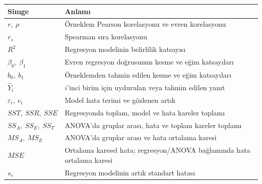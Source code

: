 \par\smallskip
\begin{center}
\begin{tabular}{@{}>{\RaggedRight\arraybackslash}p{}>{\RaggedRight\arraybackslash}p{}@{}}
\toprule
\textbf{Simge} & \textbf{Anlamı} \\
\midrule
$r,\ \rho$ & Örneklem Pearson korelasyonu ve evren korelasyonu \\
$r_s$ & Spearman sıra korelasyonu \\
$R^2$ & Regresyon modelinin belirlilik katsayısı \\
$\beta_0,\ \beta_1$ & Evren regresyon doğrusunun kesme ve eğim katsayıları \\
$b_0,\ b_1$ & Örneklemden tahmin edilen kesme ve eğim katsayıları \\
$\widehat Y_i$ & $i$'inci birim için uydurulan veya tahmin edilen yanıt \\
$\varepsilon_i,\ e_i$ & Model hata terimi ve gözlenen artık \\
$SST,\ SSR,\ SSE$ & Regresyonda toplam, model ve hata kareler toplamı \\
$SS_A,\ SS_E,\ SS_T$ & ANOVA'da gruplar arası, hata ve toplam kareler toplamı \\
$MS_A,\ MS_E$ & ANOVA'da gruplar arası ve hata ortalama karesi \\
$MSE$ & Ortalama karesel hata; regresyon/ANOVA bağlamında hata ortalama karesi \\
$s_e$ & Regresyon modelinin artık standart hatası \\
\bottomrule
\end{tabular}
\end{center}

